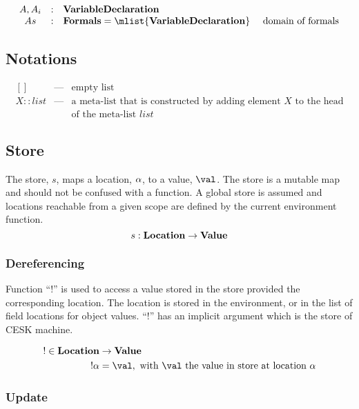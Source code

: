 \documentclass[a4paper,oneside]{article}
\begin{document}
\[
  \begin{array}{ccll}
    \formal, \formali{i} & : & \dvardecl\\
    \formals & : & \dformals = \mlist{\dvardecl} &\text{ domain of formals}\\

  \end{array}
\]


\subsection{Notations}
\label{subsec:notations}

\[
  \begin{array}{lcl}
    [] &\text{---}& \text{empty list}\\
    X :: list &\text{---}& \text{a meta-list that is constructed by adding element $X$ to the head}\\
    && \text{of the meta-list $list$}
  \end{array}
\]


\subsection{Store}
\label{subsec:store-definition}

The store, $s$, maps a location, $\alpha$, to a value, $\val$.
The store is a mutable map and should not be confused with a function.
A global store is assumed and locations reachable from a given scope are defined by the current environment function.
\[s : \mathbf{Location} \rightarrow \mathbf{Value} \]


\subsubsection{Dereferencing}
\label{subsubsection:dereferecing}

\newcommand{\deref}[1]{!#1}
Function ``$\deref{}$'' is used to access a value stored in the store provided the corresponding location.
The location is stored in the environment, or in the list of field locations for object values.
``$\deref{}$'' has an implicit argument which is the store of CESK machine.

\begin{align*}
  \deref{} \in \dlocation &\rightarrow \dval \\
  \deref{\loc} &=  \val, \text{ with $\val$ the value in store at location } \loc
\end{align*}


\subsubsection{Update}
\label{subsubsec:store-update}
\end{document}

